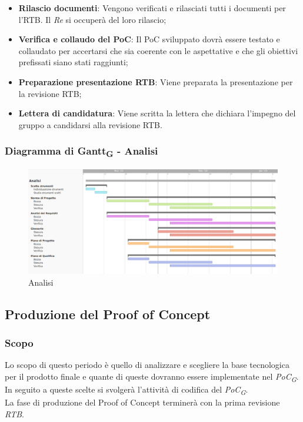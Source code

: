 \:
\begin{itemize}
	\item \textbf{Rilascio documenti}: Vengono verificati e rilasciati tutti i documenti per l'RTB. Il \textit{Re} si occuperà del loro rilascio;
	\item \textbf{Verifica e collaudo del PoC}: Il PoC sviluppato dovrà essere testato e collaudato per accertarsi che sia coerente con le aspettative e che gli obiettivi prefissati siano stati raggiunti;
	\item \textbf{Preparazione presentazione RTB}: Viene preparata la presentazione per la revisione RTB;
	\item \textbf{Lettera di candidatura}: Viene scritta la lettera che dichiara l'impegno del gruppo a candidarsi alla revisione RTB.
\end{itemize}

\subsubsection{Diagramma di Gantt\textsubscript{G} - Analisi}

\begin{figure}[H]
\centering
\includegraphics[width=\textwidth]{img/4_analisi.png}
\caption{Analisi}
\end{figure}

\subsection{Produzione del Proof of Concept}
\subsubsection{Scopo}
Lo scopo di questo periodo è quello di analizzare e scegliere la base tecnologica per il prodotto finale e quante di queste dovranno essere implementate nel \textit{PoC\textsubscript{G}}. In seguito a queste scelte si svolgerà l’attività di codifica del \textit{PoC\textsubscript{G}}.\\
La fase di produzione del Proof of Concept terminerà con la prima revisione \textit{RTB}.
